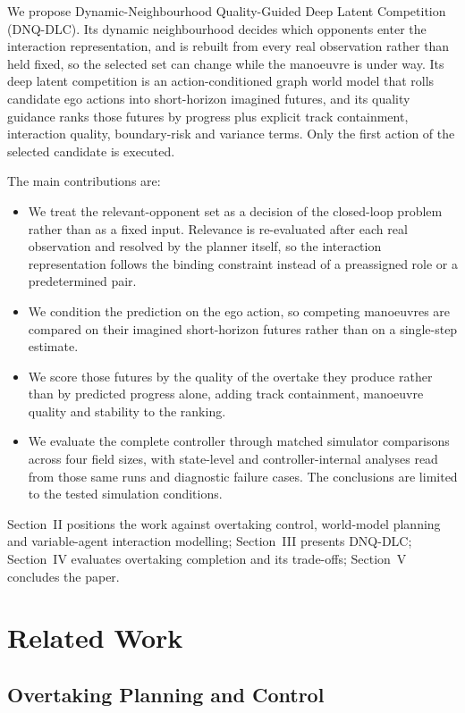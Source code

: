 \documentclass[journal]{IEEEtran}
\begin{document}
We propose Dynamic-Neighbourhood Quality-Guided Deep Latent Competition
(DNQ-DLC). Its dynamic neighbourhood decides which opponents enter the
interaction representation, and is rebuilt from every real observation rather
than held fixed, so the selected set can change while the manoeuvre is under way.
Its deep latent competition is an action-conditioned graph world model that rolls
candidate ego actions into short-horizon imagined futures, and its quality
guidance ranks those futures by progress plus explicit track containment,
interaction quality, boundary-risk and variance terms. Only the first action of
the selected candidate is executed.

The main contributions are:
\begin{itemize}
\item We treat the relevant-opponent set as a decision of the closed-loop
problem rather than as a fixed input. Relevance is re-evaluated after each real
observation and resolved by the planner itself, so the interaction
representation follows the binding constraint instead of a preassigned role or a
predetermined pair.
\item We condition the prediction on the ego action, so competing manoeuvres are
compared on their imagined short-horizon futures rather than on a single-step
estimate.
\item We score those futures by the quality of the overtake they produce rather
than by predicted progress alone, adding track containment, manoeuvre quality
and stability to the ranking.
\item We evaluate the complete controller through matched simulator comparisons
across four field sizes, with state-level and controller-internal analyses read
from those same runs and diagnostic failure cases. The conclusions are limited
to the tested simulation conditions.
\end{itemize}

Section~II positions the work against overtaking control, world-model planning
and variable-agent interaction modelling; Section~III presents DNQ-DLC;
Section~IV evaluates overtaking completion and its trade-offs; Section~V
concludes the paper.

\section{Related Work}
\label{sec:related_work}

\subsection{Overtaking Planning and Control}
\end{document}
